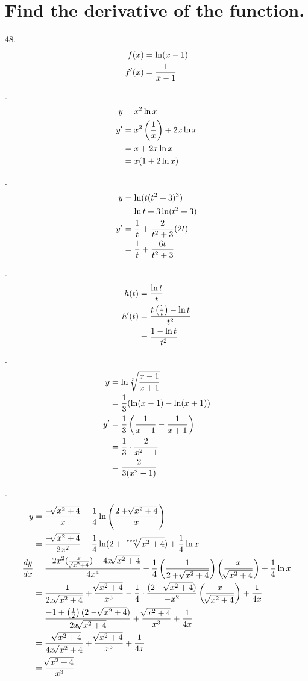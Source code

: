 \documentclass[11pt]{article}
\newcommand*{\vs}{\vspace{1cm}}
\newcommand*{\next}{\noindent}
\newcommand*{\set}{\setcounter{equation}{0}}
\newcommand*{\lt}{\left}
\newcommand*{\rt}{\right}
\begin{document}
\section{Find the derivative of the function.}
48.\begin{align}
    \set
    f(x)&=\ln(x-1)\\
    f'(x)&=\frac{1}{x-1}
\end{align}

\vs\next
52.\begin{align}
    \set
    y&=x^2\ln x\\
    y'&=x^2\lt(\frac{1}{x}\rt)+2x\ln x\\
    &=x+2x\ln x\\
    &=x(1+2\ln x)
\end{align}

\vs\next
56.\begin{align}
    \set
    y&=\ln(t(t^2+3)^3)\\
    &=\ln t+3\ln(t^2+3)\\
    y'&=\frac{1}{t}+\frac{2}{t^2+3}(2t)\\
    &=\frac{1}{t}+\frac{6t}{t^2+3}
\end{align}

\vs\next
60.\begin{align}
    \set
    h(t)&=\frac{\ln t}{t}\\
    h'(t)&=\frac{t\lt(\frac{1}{t}\rt)-\ln t}{t^2}\\
    &=\frac{1-\ln t}{t^2}
\end{align}

\vs\next
64.\begin{align}
    \set
    y&=\ln\sqrt[3]{\frac{x-1}{x+1}}\\
    &=\frac{1}{3}(\ln(x-1)-\ln(x+1))\\
    y'&=\frac{1}{3}\lt(\frac{1}{x-1}-\frac{1}{x+1}\rt)\\
    &=\frac{1}{3}\cdot\frac{2}{x^2-1}\\
    &=\frac{2}{3(x^2-1)}
\end{align}

\vs\next
68.\begin{align}
    \set
    y&=\frac{-\sqrt[]{x^2+4}}{x}-\frac{1}{4}\ln\lt(\frac{2+\sqrt[]{x^2+4}}{x}\rt)\\
    &=\frac{-\sqrt[]{x^2+4}}{2x^2}-\frac{1}{4}\ln(2+\sqrt[root]{x^2+4})+\frac{1}{4}\ln x\\
    \frac{dy}{dx}&=\frac{-2x^2(\frac{x}{\sqrt[]{x^2+4}})+4x\sqrt[]{x^2+4}}{4x^4}-\frac{1}{4}\lt(\frac{1}{2+\sqrt[]{x^2+4}}\rt)\lt(\frac{x}{\sqrt[]{x^2+4}}\rt)+\frac{1}{4}\ln x\\
    &=\frac{-1}{2x\sqrt[]{x^2+4}}+\frac{\sqrt[]{x^2+4}}{x^3}-\frac{1}{4}\cdot\frac{(2-\sqrt[]{x^2+4})}{-x^2}\lt(\frac{x}{\sqrt[]{x^2+4}}\rt)+\frac{1}{4x}\\
    &=\frac{-1+\lt(\frac{1}{2}\rt)(2-\sqrt[]{x^2+4})}{2x\sqrt[]{x^2+4}}+\frac{\sqrt[]{x^2+4}}{x^3}+\frac{1}{4x}\\
    &=\frac{-\sqrt[]{x^2+4}}{4x\sqrt[]{x^2+4}}+\frac{\sqrt[]{x^2+4}}{x^3}+\frac{1}{4x}\\
    &=\frac{\sqrt[]{x^2+4}}{x^3}
\end{align}
\end{document}
